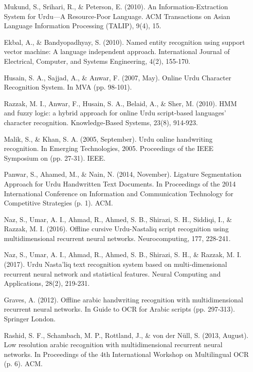 \documentclass[a4paper,conference]{IEEEtran}
\begin{document}
\begin{thebibliography}{130}
Mukund, S., Srihari, R., \& Peterson, E. (2010). An Information-Extraction System for Urdu---A Resource-Poor Language. ACM Transactions on Asian Language Information Processing (TALIP), 9(4), 15.

Ekbal, A., \& Bandyopadhyay, S. (2010). Named entity recognition using support vector machine: A language independent approach. International Journal of Electrical, Computer, and Systems Engineering, 4(2), 155-170.

Husain, S. A., Sajjad, A., \& Anwar, F. (2007, May). Online Urdu Character Recognition System. In MVA (pp. 98-101).

Razzak, M. I., Anwar, F., Husain, S. A., Belaid, A., \& Sher, M. (2010). HMM and fuzzy logic: a hybrid approach for online Urdu script-based languages’ character recognition. Knowledge-Based Systems, 23(8), 914-923.

Malik, S., \& Khan, S. A. (2005, September). Urdu online handwriting recognition. In Emerging Technologies, 2005. Proceedings of the IEEE Symposium on (pp. 27-31). IEEE.

Panwar, S., Ahamed, M., \& Nain, N. (2014, November). Ligature Segmentation Approach for Urdu Handwritten Text Documents. In Proceedings of the 2014 International Conference on Information and Communication Technology for Competitive Strategies (p. 1). ACM.

Naz, S., Umar, A. I., Ahmad, R., Ahmed, S. B., Shirazi, S. H., Siddiqi, I., \& Razzak, M. I. (2016). Offline cursive Urdu-Nastaliq script recognition using multidimensional recurrent neural networks. Neurocomputing, 177, 228-241.

Naz, S., Umar, A. I., Ahmad, R., Ahmed, S. B., Shirazi, S. H., \& Razzak, M. I. (2017). Urdu Nasta’liq text recognition system based on multi-dimensional recurrent neural network and statistical features. Neural Computing and Applications, 28(2), 219-231.

Graves, A. (2012). Offline arabic handwriting recognition with multidimensional recurrent neural networks. In Guide to OCR for Arabic scripts (pp. 297-313). Springer London.

Rashid, S. F., Schambach, M. P., Rottland, J., \& von der Nüll, S. (2013, August). Low resolution arabic recognition with multidimensional recurrent neural networks. In Proceedings of the 4th International Workshop on Multilingual OCR (p. 6). ACM.


\end{thebibliography}
\end{document}
